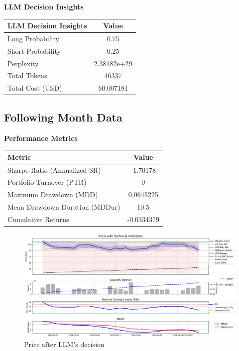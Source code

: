 \documentclass[8pt]{scrartcl}
\begin{document}
\textbf{LLM Decision Insights}

\begin{longtable}{l c}
\toprule
\textbf{LLM Decision Insights} & \textbf{Value} \\
\midrule
Long Probability & 0.75 \\
Short Probability & 0.25 \\
Perplexity & 2.38182e+29 \\
\midrule
Total Tokens & 46337 \\
Total Cost (USD) & \$0.007181 \\
\bottomrule
\end{longtable}

\subsection*{Following Month Data}

\textbf{Performance Metrics}

\begin{longtable}{l c}
\toprule
\textbf{Metric} & \textbf{Value} \\
\midrule
Sharpe Ratio (Annualized SR) & -1.70178 \\
Portfolio Turnover (PTR) & 0 \\
Maximum Drawdown (MDD) & 0.0645225 \\
Mean Drawdown Duration (MDDur) & 10.5 \\
Cumulative Returns & -0.0334379 \\
\bottomrule
\end{longtable}

\begin{figure}[H]
    \centering
    \includegraphics[width=1\linewidth]{judge_reviews//AMZN_M_gpt-4o-mini/2018-09-03/llm_Price_with_Technical_Indicators.png}
    \caption{Price after LLM's decision}
\end{figure}
\end{document}
